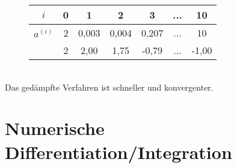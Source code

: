 \documentclass{scrartcl}
\begin{document}
\begin{figure}[h]
\center
\begin{tabular}{|c||c|c|c|c|c|c|}

$i$ & 0 & 1 & 2 & 3 & ... & 10 \\ 
\hline 
$a^{(i)}$ & 2 & 0,003 & 0,004 & 0,207 & ... & 10\\  
 & 2 & 2,00 & 1,75 & -0,79 & ... & -1,00\\ 

\end{tabular}
\end{figure}\\
Das gedämpfte Verfahren ist schneller und konvergenter.


\section{Numerische Differentiation/Integration}
\end{document}
